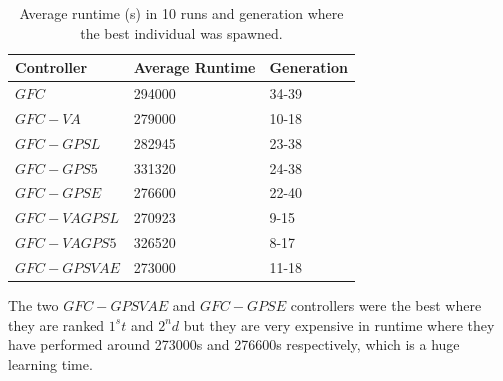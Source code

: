 \documentclass[10pt,journal,compsoc]{IEEEtran}
\begin{document}
\begin{table}[!ht]
	\centering
	{\scriptsize
          \caption{Average runtime (s) in 10 runs
            and
                  generation where the best individual was spawned.}
		\label{tab:time}
		\begin{tabular}{|p{2.85cm}|p{1.65cm}|p{1.65cm}|}
			\hline 	
			\hline  
			Controller& \textbf{Average Runtime}&\textbf{Generation}\\
                  \hline \textbf{\textbf{$GFC$}} \cite{salem_cig2018}&294000
                   &34-39\\
			\hline \textbf{$GFC-VA$} \cite{DBLP:conf/cig/SalemMG19}&279000
			 	&10-18\\	
			\hline \textbf{$GFC-GPSL$} \cite{DBLP:conf/cig/SalemMG19}& 282945
			 &23-38\\	
			\hline \textbf{$GFC-GPS5$} \cite{DBLP:conf/cig/SalemMG19}&331320
				&24-38\\	
			\hline \textbf{$GFC-GPSE$}&	276600
			 &22-40\\	
			\hline \textbf{$GFC-VAGPSL$} \cite{DBLP:conf/cig/SalemMG19}& 270923
				&9-15\\	
			\hline\textbf{$GFC-VAGPS5$} \cite{DBLP:conf/cig/SalemMG19}&	326520
			 &8-17\\	
			\hline\textbf{$GFC-GPSVAE$}& 273000
				&11-18\\					
			\hline 
		\end{tabular}
		
	}
\end{table} 

The two $GFC-GPSVAE$ and $GFC-GPSE$ controllers were the best where
they are ranked $1^st$ and $2^nd$ but they are very expensive in runtime
where they have performed around 273000s and 276600s respectively, which is a
huge learning time. %
                    
                 
\end{document}
